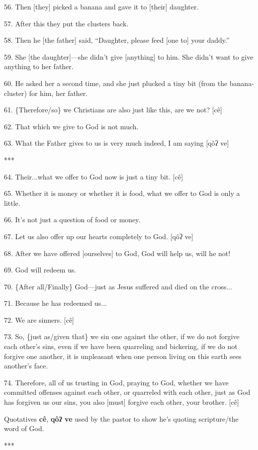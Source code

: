 56. Then [they] picked a banana and gave it to [their] daughter.

57. After this they put the clusters back.

58. Then he [the father] said, ``Daughter, please feed [one to] your daddy.''

59. She [the daughter]---she didn't give [anything] to him. She didn't want to
give anything to her father.

60. He asked her a second time, and she just plucked a tiny bit (from the banana-cluster)
for him, her father.

61. \{Therefore/so\} we Christians are also just like this, are we not? [cê]

62. That which we give to God is not much.

63. What the Father gives to us is very much indeed, I am saying [qôʔ ve]

***

64. Their...what we offer to God now is just a tiny bit. [cê]

65. Whether it is money or whether it is food, what we offer to God is only a little.

66. It's not just a question of food or money.

67. Let us also offer up our hearts completely to God. [qôʔ ve]

68. After we have offered [ourselves] to God, God will help us, will he not!

69. God will redeem us.

70. \{After all/Finally\} God---just as Jesus suffered and died on the cross...

71. Because he has redeemed us...

72. We are sinners. [cê]

73. So, \{just as/given that\} we sin one against the other, if we do not forgive
each other's sins, even if we have been quarreling and bickering, if we do not
forgive one another, it is unpleasant when one person living on this earth sees
another's face.

74. Therefore, all of us trusting in God, praying to God, whether we have committed
offenses against each other, or quarreled with each other, just as God has forgiven
us our sins, you also [must] forgive each other, your brother. [cê]

Quotatives \textbf{cê}, \textbf{qôʔ ve }used by the pastor to show he's quoting
scripture/the word of God.

***

